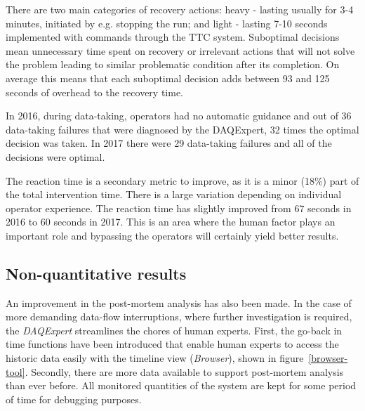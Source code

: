 \documentclass[a4paper]{jpconf}
\begin{document}
There are two main categories of recovery actions: heavy - lasting usually for 3-4 minutes, initiated by e.g. stopping the run; and light - lasting 7-10 seconds implemented with commands through the TTC system. Suboptimal decisions mean unnecessary time spent on recovery or irrelevant actions that will not solve the problem leading to similar problematic condition after its completion. On average this means that each suboptimal decision adds between 93 and 125 seconds of overhead to the recovery time.

In 2016, during data-taking, operators had no automatic guidance and out of 36 data-taking failures that were diagnosed by the DAQExpert, 32 times the optimal decision was taken. In 2017 there were 29 data-taking failures and all of the decisions were optimal.

The reaction time is a secondary metric to improve, as it is a minor (18\%) part of the total intervention time. There is a large variation depending on individual operator experience. The reaction time has slightly improved from 67 seconds in 2016 to 60 seconds in 2017. This is an area where the human factor plays an important role and bypassing the operators will certainly yield better results.


\subsection{Non-quantitative results}
An improvement in the post-mortem analysis has also been made. In the case of more demanding data-flow interruptions, where further investigation is required, the{ \it DAQExpert} streamlines the chores of human experts. First, the go-back in time functions have been introduced that enable human experts to access the historic data easily with the timeline view ({\it Browser}), shown in figure~\ref {browser-tool}. Secondly, there are more data available to support post-mortem analysis than ever before. All monitored quantities of the system are kept for some period of time for debugging purposes.
\end{document}
